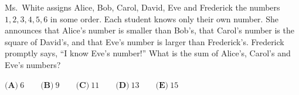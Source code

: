 Ms.\ White assigns Alice, Bob, Carol, David, Eve and Frederick the numbers $1,2,3,4,5,6$ in some order. Each student knows only their own number. She announces that Alice's number is smaller than Bob's, that Carol's number is the square of David's, and that Eve's number is larger than Frederick's. Frederick promptly says, ``I know Eve's number!'' What is the sum of Alice's, Carol's and Eve's numbers?

$\textbf{(A)}\ 6\qquad\textbf{(B)}\ 9\qquad\textbf{(C)}\ 11\qquad\textbf{(D)}\ 13\qquad\textbf{(E)}\ 15$
